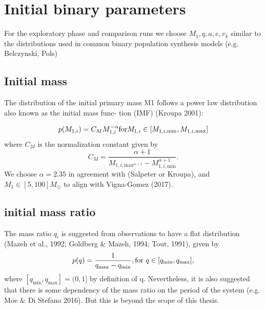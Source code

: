 \section{Initial binary parameters}

For the exploratory phase and comparison runs we choose $M_1, q, a, e, v_k $ similar to the distributions used in common binary population synthesis models (e.g. Belczynski, Pols)



\subsection{Initial mass}
The distribution of the initial primary mass M1 follows a
power law distribution also known as the initial mass func-
tion (IMF) (Kroupa 2001):


%
\begin{equation}
	p(M_{1,i}) = C_M M_{1,i}^{-\alpha} \vspace{0.2cm} \text{for} M_{1,i} \in [M_{1,i,\text{min}}, M_{1,i,\text{max}}] 
\label{eq:priorIMF}
\end{equation}
%
where $C_M$ is the normalization constant given by
%
\begin{equation}
	C_M = \frac{\alpha + 1}{M_{1,i,\text{max}^{\alpha +1}} - M_{1,i,\text{min}}^{\alpha+1}}.
\end{equation}
We choose $\alpha = 2.35$ in agreement with (Salpeter or Kroupa), and $M_1 \in [5, 100] M_{\odot}$ to align with Vigna-Gomez (2017). 



\subsection{initial mass ratio}
The mass ratio $q_i$ is suggested from observations to have
a flat distribution (Mazeh et al., 1992; Goldberg $\&$ Mazeh,
1994; Tout, 1991), given by
%
\begin{equation}
	p(q) = \frac{1}{q_{\text{max}} - q_{\text{min}}}, \vspace{2cm} \text{for } q \in [q_{\text{min}}, q_{\text{max}}],  
\end{equation}
where $[q_{\text{min}}, q_{\text{max}}] = (0, 1]$ by definition of q. Nevertheless, it
is also suggested that there is some dependency of the mass
ratio on the period of the system (e.g. Moe $\&$ Di Stefano 2016). But this is beyond the scope of this thesis. 

